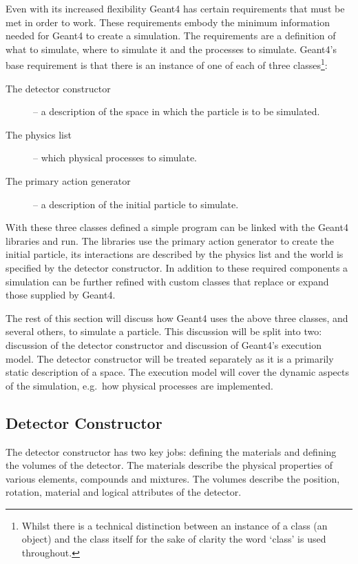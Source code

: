 Even with its increased flexibility Geant4 has certain requirements that must be met in order to work. These requirements embody the minimum information needed for Geant4 to create a simulation. The requirements are a definition of what to simulate, where to simulate it and the processes to simulate. Geant4's base requirement is that there is an instance of one of each of three classes\footnote{Whilst there is a technical distinction between an instance of a class (an object) and the class itself for the sake of clarity the word `class' is used throughout.}:
\begin{description}
  \item[The detector constructor] -- a description of the space in which the particle is to be simulated.
  \item[The physics list] -- which physical processes to simulate.
  \item[The primary action generator] -- a description of the initial particle to simulate.
\end{description}
With these three classes defined a simple program can be linked with the Geant4 libraries and run. The libraries use the primary action generator to create the initial particle, its interactions are described by the physics list and the world is specified by the detector constructor. In addition to these required components a simulation can be further refined with custom classes that replace or expand those supplied by Geant4.

The rest of this section will discuss how Geant4 uses the above three classes, and several others, to simulate a particle. This discussion will be split into two: discussion of the detector constructor and discussion of Geant4's execution model. The detector constructor will be treated separately as it is a primarily static description of a space. The execution model will cover the dynamic aspects of the simulation, e.g.\ how physical processes are implemented.

\subsection{Detector Constructor} %
\label{sub:detector_constructor}
The detector constructor has two key jobs: defining the materials and defining the volumes of the detector. The materials describe the physical properties of various elements, compounds and mixtures. The volumes describe the position, rotation, material and logical attributes of the detector. 

